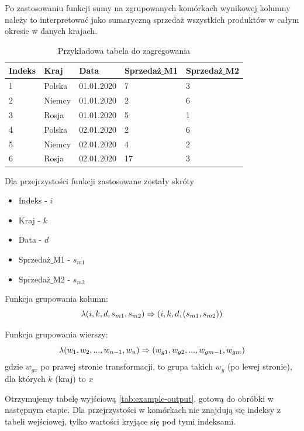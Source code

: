 \documentclass[brudnopis]{xmgr}
\begin{document}
Po zastosowaniu funkcji sumy na zgrupowanych komórkach wynikowej kolumny należy to interpretować jako sumaryczną sprzedaż wszystkich produktów w całym okresie w danych krajach.

\begin{table}[!tbh]
\begin{tabular}{|l|l|l|l|l|} \hline
Indeks & Kraj & Data & Sprzedaż$\_$M1 & Sprzedaż$\_$M2 \\ \hline
1 & Polska & 01.01.2020 & 7 & 3 \\ \hline
2 & Niemcy & 01.01.2020 & 2 & 6 \\ \hline
3 & Rosja & 01.01.2020 & 5 & 1 \\ \hline
4 & Polska & 02.01.2020 & 2 & 6 \\ \hline
5 & Niemcy & 02.01.2020 & 4 & 2 \\ \hline
6 & Rosja & 02.01.2020 & 17 & 3 \\ \hline
\end{tabular}
\caption{Przykładowa tabela do zagregowania \label{tab:example-input}}
\end{table}

Dla przejrzystości funkcji zastosowane zostały skróty

\begin{itemize}
    \item Indeks - $i$
    \item Kraj - $k$
    \item Data - $d$
    \item Sprzedaż$\_$M1 - $s_{m1}$
    \item Sprzedaż$\_$M2 - $s_{m2}$
\end{itemize}

Funkcja grupowania kolumn:
\begin{equation} \label{eq:example-col-agg}
\lambda (i, k, d, s_{m1}, s_{m2}) \\ \Rightarrow (i, k, d, (s_{m1}, s_{m2}))
\end{equation}

Funkcja grupowania wierszy:
\begin{equation} \label{eq:example-row-agg}
\lambda (w_1, w_2, ..., w_{n-1}, w_n) \\ \Rightarrow (w_{g1}, w_{g2}, ..., w_{gm-1}, w_{gm}) 
\end{equation}
gdzie $w_{gx}$ po prawej stronie transformacji, to grupa takich $w_y$ (po lewej stronie), dla których $k$ (kraj) to $x$

Otrzymujemy tabelę wyjściową \ref{tab:example-output}, gotową do obróbki w następnym etapie.
Dla przejrzystości w komórkach nie znajdują się indeksy z tabeli wejściowej, tylko wartości kryjące się pod tymi indeksami.
\end{document}
